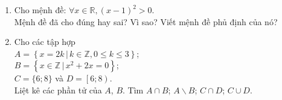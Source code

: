 
\begin{bt}%
	\begin{enumerate} 
		\item Cho mệnh đề: $\forall x \in \mathbb{R},(x-1)^2>0$. \\
		Mệnh đề đã cho đúng hay sai? Vì sao? Viết mệnh đề phủ định của nó?
		\item Cho các tập hợp \\
		$A=\left\{x=2 k \,|\, k \in \mathbb{Z}, 0 \leq k \leq 3\right\} $;\\
		$B=\left\{x \in \mathbb{Z} \,|\,  x^2+2x=0\right\}$; \\
		$C=\{6;8\}$ và $D=\left[6;8\right)$.\\
		Liệt kê các phần tử của $A$, $B$. Tìm $A \cap B$; $ A \backslash B$; $C \cap D$; $ C \cup D$.
	\end{enumerate}
	
\end{bt}

